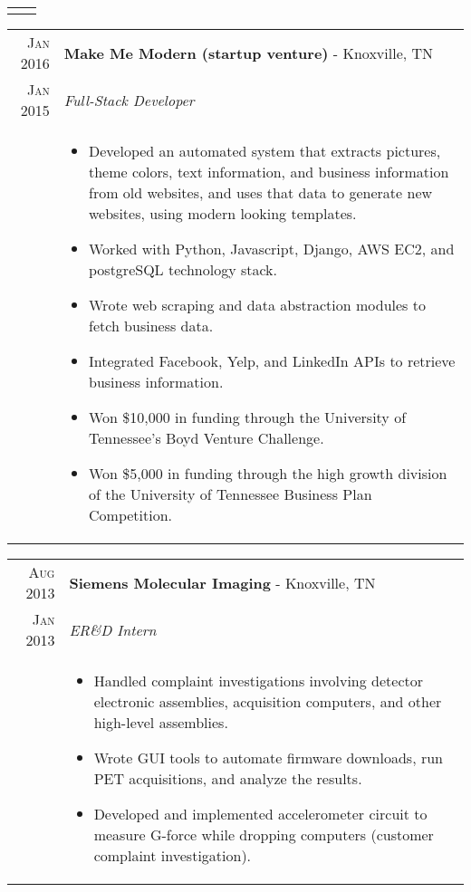 \documentclass[a4paper,11pt]{article}
\begin{document}
\begin{tabularx}{\textwidth}{R|X}
{\begin{itemize}[leftmargin=20pt,topsep=1pt,itemsep=1pt,partopsep=0pt, parsep=1pt]
      \vspace{-0.5cm}
      \end{itemize}}\\
\end{tabularx}

\begin{tabularx}{\textwidth}{R|X}
   \textsc{Jan 2016} & \textbf{Make Me Modern (startup venture)} \-- Knoxville, TN\\
   \textsc{Jan 2015} & \emph{Full-Stack Developer}\\
   & \small{
      \begin{itemize}[leftmargin=20pt,topsep=1pt,itemsep=1pt,partopsep=0pt, parsep=1pt]
         \item Developed an automated system that extracts pictures, theme colors, text information, and business information from old websites, and uses that data to generate new websites, using modern looking templates.
         \item Worked with Python, Javascript, Django, AWS EC2, and postgreSQL technology stack.
         \item Wrote web scraping and data abstraction modules to fetch business data.
         \item Integrated Facebook, Yelp, and LinkedIn APIs to retrieve business information.
         \item Won \$10,000 in funding through the University of Tennessee's Boyd Venture Challenge.
         \item Won \$5,000 in funding through the high growth division of the University of Tennessee Business Plan Competition.
      \vspace{-0.5cm}
      \end{itemize}}\\
\end{tabularx}

\begin{tabularx}{\textwidth}{R|X}
   \textsc{Aug 2013} & \textbf{Siemens Molecular Imaging} \-- Knoxville, TN\\
   \textsc{Jan 2013} & \emph{ER\&D Intern}\\
   & \small{
      \begin{itemize}[leftmargin=20pt,topsep=1pt,itemsep=1pt,partopsep=0pt, parsep=1pt]
         \item Handled complaint investigations involving detector electronic assemblies, acquisition computers, and other high-level assemblies.
         \item Wrote GUI tools to automate firmware downloads, run PET acquisitions, and analyze the results.
         \item Developed and implemented accelerometer circuit to measure G-force while dropping computers (customer complaint investigation).
      \vspace{-0.5cm}
      \end{itemize}}\\
\end{tabularx}
\end{document}
